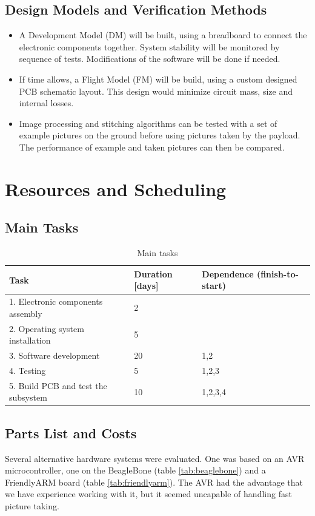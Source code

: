 \documentclass[fontsize=11pt,paper=a4,]{scrartcl}
\begin{document}
\subsection{Design Models and Verification Methods}
\begin{itemize}
\item A Development Model (DM) will be built, using a breadboard to connect the electronic components together. System stability will be monitored by sequence of tests. Modifications of the software will be done if needed.
\item If time allows, a Flight Model (FM) will be build, using a custom designed PCB schematic layout. This design would minimize circuit mass, size and internal losses.
\item {\color{red} Image processing and stitching algorithms can be tested with a set of example pictures on the ground before using pictures taken by the payload. The performance of example and taken pictures can then be compared.}
\end{itemize}


\section{Resources and Scheduling}
\subsection{Main Tasks}
\begin{table}[htbp!]
\centering
\caption{Main tasks}
\label{tab:main_tasks}
\begin{tabular}{| l | l | l |} \hline
Task & Duration [days] & Dependence (finish-to-start) \\ \hline
1. Electronic components assembly & 2 & \\ \hline
2. Operating system installation & 5 & \\ \hline
3. Software development & 20 & 1,2 \\ \hline
4. Testing & 5 & 1,2,3 \\ \hline
5. Build PCB and test the subsystem & 10 & 1,2,3,4 \\ \hline
\end{tabular}
\vspace{-1.0em}
\end{table}


\FloatBarrier
\subsection{Parts List and Costs}
Several alternative hardware systems were evaluated.
One was based on an AVR microcontroller, one on the BeagleBone (table \ref{tab:beaglebone}) and a FriendlyARM board (table \ref{tab:friendlyarm}).
The AVR had the advantage that we have experience working with it, but it seemed uncapable of handling fast picture taking.
\end{document}
